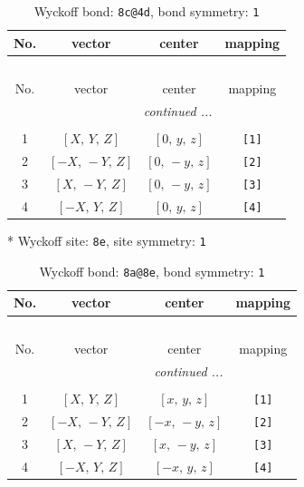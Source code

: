 \documentclass[fleqn,8pt]{jsarticle}
\begin{document}
\begin{longtable}{cccc}
\caption{Wyckoff bond: {\tt 8c@4d}, bond symmetry: {\tt 1}}
 \\
 \hline \hline
No. & vector & center & mapping \\ \hline \endfirsthead

\multicolumn{3}{l}{\tablename\ \thetable{}} \\
 \hline \hline
No. & vector & center & mapping \\ \hline \endhead

 \hline \hline
\multicolumn{3}{r}{\footnotesize\it continued ...} \\ \endfoot

 \hline \hline
\multicolumn{3}{r}{} \\ \endlastfoot

1 & $\left[ X,\, Y,\, Z \right]$ & $\left[ 0,\, y,\, z \right]$ & {\tt [1]} \\ \hline
2 & $\left[ - X,\, - Y,\, Z \right]$ & $\left[ 0,\, - y,\, z \right]$ & {\tt [2]} \\ \hline
3 & $\left[ X,\, - Y,\, Z \right]$ & $\left[ 0,\, - y,\, z \right]$ & {\tt [3]} \\ \hline
4 & $\left[ - X,\, Y,\, Z \right]$ & $\left[ 0,\, y,\, z \right]$ & {\tt [4]} \\
\end{longtable}
* Wyckoff site: {\tt 8e}, site symmetry: {\tt 1}
\renewcommand{\arraystretch}{1.2}
\begin{longtable}{cccc}
\caption{Wyckoff bond: {\tt 8a@8e}, bond symmetry: {\tt 1}}
 \\
 \hline \hline
No. & vector & center & mapping \\ \hline \endfirsthead

\multicolumn{3}{l}{\tablename\ \thetable{}} \\
 \hline \hline
No. & vector & center & mapping \\ \hline \endhead

 \hline \hline
\multicolumn{3}{r}{\footnotesize\it continued ...} \\ \endfoot

 \hline \hline
\multicolumn{3}{r}{} \\ \endlastfoot

1 & $\left[ X,\, Y,\, Z \right]$ & $\left[ x,\, y,\, z \right]$ & {\tt [1]} \\ \hline
2 & $\left[ - X,\, - Y,\, Z \right]$ & $\left[ - x,\, - y,\, z \right]$ & {\tt [2]} \\ \hline
3 & $\left[ X,\, - Y,\, Z \right]$ & $\left[ x,\, - y,\, z \right]$ & {\tt [3]} \\ \hline
4 & $\left[ - X,\, Y,\, Z \right]$ & $\left[ - x,\, y,\, z \right]$ & {\tt [4]} \\
\end{longtable}
\end{document}
